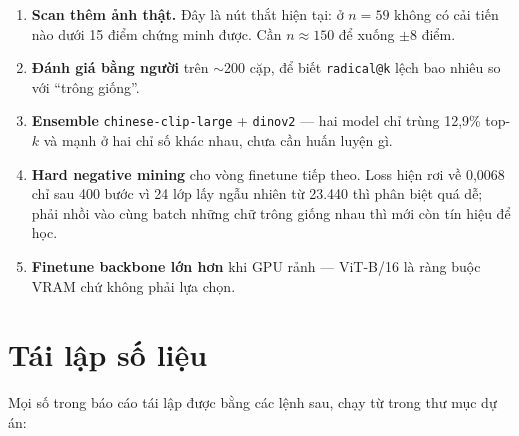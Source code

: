 \documentclass[11pt,a4paper]{article}
\newcommand{\code}[1]{\texttt{#1}}
\begin{document}
\begin{enumerate}
  \item \textbf{Scan thêm ảnh thật.} Đây là nút thắt hiện tại: ở $n = 59$ không có cải tiến nào dưới
        15 điểm chứng minh được. Cần $n \approx 150$ để xuống $\pm$8 điểm.
  \item \textbf{Đánh giá bằng người} trên $\sim$200 cặp, để biết \code{radical@k} lệch bao nhiêu so
        với ``trông giống''.
  \item \textbf{Ensemble} \code{chinese-clip-large} + \code{dinov2} --- hai model chỉ trùng 12,9\%
        top-$k$ và mạnh ở hai chỉ số khác nhau, chưa cần huấn luyện gì.
  \item \textbf{Hard negative mining} cho vòng finetune tiếp theo. Loss hiện rơi về 0,0068 chỉ sau
        400 bước vì 24 lớp lấy ngẫu nhiên từ 23.440 thì phân biệt quá dễ; phải nhồi vào cùng batch
        những chữ trông giống nhau thì mới còn tín hiệu để học.
  \item \textbf{Finetune backbone lớn hơn} khi GPU rảnh --- ViT-B/16 là ràng buộc VRAM chứ không
        phải lựa chọn.
\end{enumerate}

\appendix
\section{Tái lập số liệu}

Mọi số trong báo cáo tái lập được bằng các lệnh sau, chạy từ trong thư mục dự án:
\end{document}
